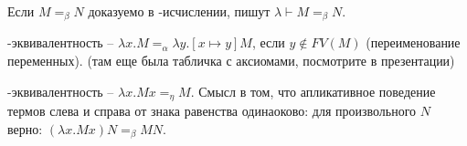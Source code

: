Если $M =_{\beta} N$ доказуемо в \lambda-исчислении, пишут $\lambda \vdash M =_{\beta} N$.

\begin{definition}
    \alpha-эквивалентность -- $\lambda x. M =_{\alpha} \lambda y. [x \mapsto y] M$, если $y \notin FV(M)$ (переименование переменных). (там еще была табличка с аксиомами, посмотрите в презентации)
\end{definition}

\begin{definition}
    \eta-эквивалентность -- $\lambda x. M x =_{\eta} M$. Смысл в том, что апликативное поведение термов слева и справа от знака равенства одинаоково: для произвольного $N$ верно: $(\lambda x. M x)N =_{\beta} MN$.
\end{definition}


